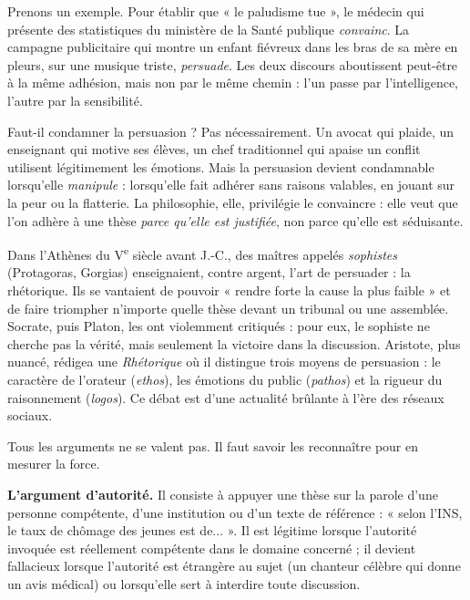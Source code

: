 \documentclass[11pt]{article}
\newcommand{\cle}[1]{{\popxbold\color{popdark}#1}}
\newcounter{popsec}
\newcounter{popsub}
\newcommand{\courssub}[1]{%
  \stepcounter{popsub}%
  \par\vspace{9pt}\noindent{\popxbold\fontsize{11.5}{13}\selectfont\color{popink}{\color{poporange}\thepopsec.\thepopsub}\hspace{6pt}#1}\par\nopagebreak\vspace{4pt}
}
\begin{document}
Prenons un exemple. Pour établir que « le paludisme tue », le médecin qui présente des statistiques du ministère de la Santé publique \emph{convainc}. La campagne publicitaire qui montre un enfant fiévreux dans les bras de sa mère en pleurs, sur une musique triste, \emph{persuade}. Les deux discours aboutissent peut-être à la même adhésion, mais non par le même chemin : l'un passe par l'intelligence, l'autre par la sensibilité.

Faut-il condamner la persuasion ? Pas nécessairement. Un avocat qui plaide, un enseignant qui motive ses élèves, un chef traditionnel qui apaise un conflit utilisent légitimement les émotions. Mais la persuasion devient condamnable lorsqu'elle \emph{manipule} : lorsqu'elle fait adhérer sans raisons valables, en jouant sur la peur ou la flatterie. La philosophie, elle, privilégie le convaincre : elle veut que l'on adhère à une thèse \emph{parce qu'elle est justifiée}, non parce qu'elle est séduisante.

\begin{savaistu}
Dans l'Athènes du V\textsuperscript{e} siècle avant J.-C., des maîtres appelés \emph{sophistes} (Protagoras, Gorgias) enseignaient, contre argent, l'art de persuader : la \cle{rhétorique}. Ils se vantaient de pouvoir « rendre forte la cause la plus faible » et de faire triompher n'importe quelle thèse devant un tribunal ou une assemblée. Socrate, puis Platon, les ont violemment critiqués : pour eux, le sophiste ne cherche pas la vérité, mais seulement la victoire dans la discussion. Aristote, plus nuancé, rédigea une \emph{Rhétorique} où il distingue trois moyens de persuasion : le caractère de l'orateur (\emph{ethos}), les émotions du public (\emph{pathos}) et la rigueur du raisonnement (\emph{logos}). Ce débat est d'une actualité brûlante à l'ère des réseaux sociaux.
\end{savaistu}

\courssub{Les types d'arguments}

Tous les arguments ne se valent pas. Il faut savoir les reconnaître pour en mesurer la force.

\textbf{L'argument d'autorité.} Il consiste à appuyer une thèse sur la parole d'une personne compétente, d'une institution ou d'un texte de référence : « selon l'INS, le taux de chômage des jeunes est de... ». Il est légitime lorsque l'autorité invoquée est réellement compétente dans le domaine concerné ; il devient fallacieux lorsque l'autorité est étrangère au sujet (un chanteur célèbre qui donne un avis médical) ou lorsqu'elle sert à interdire toute discussion.
\end{document}
